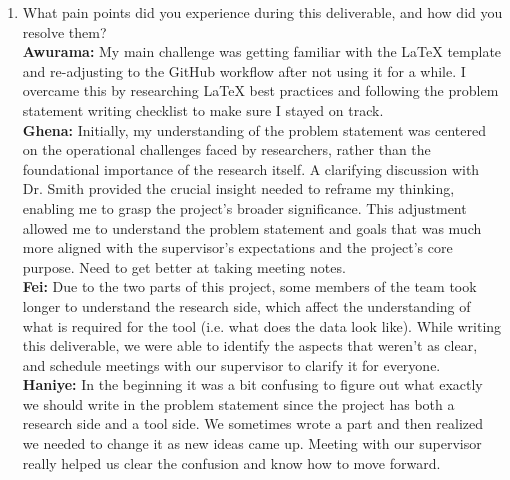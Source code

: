 \documentclass{article}
\begin{document}
\begin{enumerate}
    \item What pain points did you experience during this deliverable, and how
    did you resolve them? \\
    \textbf{Awurama:} My main challenge was getting familiar with the LaTeX template and re-adjusting to the GitHub workflow after not using it for a while. I overcame this by researching LaTeX best practices and following the problem statement writing checklist to make sure I stayed on track.
    \\\textbf{Ghena:} Initially, my understanding of the problem statement was centered on the operational challenges faced by researchers, rather than the foundational importance of the research itself. A clarifying discussion with Dr. Smith provided the crucial insight needed to reframe my thinking, enabling me to grasp the project's broader significance. This adjustment allowed me to understand the problem statement and goals that was much more aligned with the supervisor's expectations and the project's core purpose. Need to get better at taking meeting notes.
    \\\textbf{Fei:} Due to the two parts of this project, some members of the team took longer to understand the research side, which affect the understanding of what is required for the tool (i.e. what does the data look like). While writing this deliverable, we were able to identify the aspects that weren’t as clear, and schedule meetings with our supervisor to clarify it for everyone.
    \\\textbf{Haniye:} In the beginning it was a bit confusing to figure out what exactly we should write in the problem statement since the project has both a research side and a tool side. We sometimes wrote a part and then realized we needed to change it as new ideas came up. Meeting with our supervisor really helped us clear the confusion and know how to move forward.


\end{enumerate}
\end{document}

